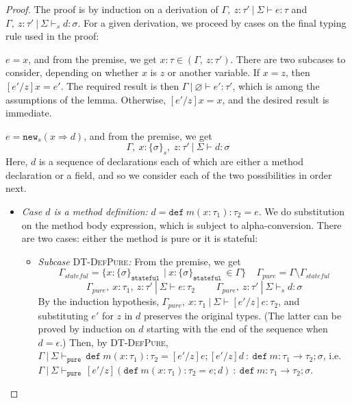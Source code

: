 \documentclass{llncs}
\newcommand{\keywadj}[1]{\mathtt{#1}}
\newcommand{\keyw}[1]{\keywadj{#1}~}
\newcommand{\pcase}[1][]{
  \if\relax\detokenize{#1}\relax
    \def\thiscase{}
  \else
    \def\thiscase{~#1}
  \fi
  \item
}
\begin{document}
\begin{proof} The proof is by induction on a derivation of $\Gamma,~z : \tau'~|~\Sigma \vdash e : \tau$ and $\Gamma,~z : \tau'~|~\Sigma \vdash_s d : \sigma$. For a given derivation, we proceed by cases on the final typing rule used in the proof:

\begin{pcases}
\pcase[\textsc{T-Var}]
$e = x$, and from the premise, we get $x : \tau \in (\Gamma,~z : \tau')$. There are two subcases to consider, depending on whether $x$ is $z$ or another variable. If $x = z$, then $[e'/z]x = e'$. The required result is then $\Gamma~|~\varnothing \vdash e' : \tau'$, which is among the assumptions of the lemma. Otherwise, $[e'/z]x = x$, and the desired result is immediate.
\\
\pcase[\textsc{T-New}]
$e = \keywadj{new}_{s}(x \Rightarrow d)$, and from the premise, we get
\[
\Gamma,~x : \{ \sigma \}_{s},~z : \tau'~|~\Sigma \vdash d : \sigma
\]
Here, $d$ is a sequence of declarations each of which are either a method declaration or a field, and so we consider each of the two possibilities in order next.
\\
\begin{itemize}
\item[] \textit{Case $d$ is a method definition:} $d = \keyw{def} m(x : \tau_1) : \tau_2 = e$. We do substitution on the method body expression, which is subject to alpha-conversion. There are two cases: either the method is pure or it is stateful:
\\
\begin{itemize}
\item[] \textit{Subcase} \textsc{DT-DefPure}\textit{:} From the premise, we get
\[
\Gamma_{stateful} = \{x : \{ \sigma \}_{\keyw{stateful}} ~|~ x : \{ \sigma \}_{\keyw{stateful}} \in \Gamma\}~~~~~\Gamma_{pure} = \Gamma \setminus \Gamma_{stateful}
\]\[
\Gamma_{pure},~x : \tau_1,~z : \tau'~|~\Sigma \vdash e : \tau_2~~~~~~~~~~\Gamma_{pure},~z : \tau'~|~\Sigma \vdash_s d : \sigma
\]
By the induction hypothesis, $\Gamma_{pure},~x : \tau_1~|~\Sigma \vdash [e'/z]e : \tau_2$, and substituting $e'$ for $z$ in $d$ preserves the original types. (The latter can be proved by induction on $d$ starting with the end of the sequence when $d = \epsilon$.) Then, by \textsc{DT-DefPure}, $\Gamma~|~\Sigma \vdash_{\keyw{pure}} \keyw{def} m(x : \tau_1) : \tau_2 = [e'/z]e; [e'/z]d~:~\keyw{def} m : \tau_1 \rightarrow \tau_2; \sigma$, i.e. $\Gamma~|~\Sigma \vdash_{\keyw{pure}} [e'/z](\keyw{def} m(x : \tau_1) : \tau_2 = e; d)~:~\keyw{def} m : \tau_1 \rightarrow \tau_2; \sigma$.

\end{itemize}
\end{itemize}
\end{pcases}
\end{proof}
\end{document}
